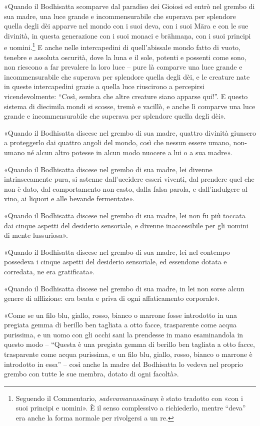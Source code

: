«Quando il Bodhisatta scomparve dal paradiso dei Gioiosi ed entrò nel
grembo di sua madre, una luce grande e incommensurabile che superava per
splendore quella degli dèi apparve nel mondo con i suoi deva, con i suoi
Māra e con le sue divinità, in questa generazione con i suoi monaci e
brāhmaṇa, con i suoi principi e uomini.\footnote{Seguendo il Commentario, \emph{sadevamanussānaṃ} è stato tradotto con «con i suoi principi e uomini». È il senso complessivo a richiederlo, mentre “deva” era anche la forma normale per rivolgersi a un re.} E anche nelle
intercapedini di quell’abissale mondo fatto di vuoto, tenebre e assoluta
oscurità, dove la luna e il sole, potenti e possenti come sono, non
riescono a far prevalere la loro luce – pure là comparve una luce grande
e incommensurabile che superava per splendore quella degli dèi, e le
creature nate in queste intercapedini grazie a quella luce riuscirono a
percepirsi vicendevolmente: “Così, sembra che altre creature siano
apparse qui!”. E questo sistema di diecimila mondi si scosse, tremò e
vacillò, e anche lì comparve una luce grande e incommensurabile che
superava per splendore quella degli dèi».


«Quando il Bodhisatta discese nel grembo di sua madre, quattro divinità
giunsero a proteggerlo dai quattro angoli del mondo, così che nessun
essere umano, non-umano né alcun altro potesse in alcun modo nuocere a
lui o a sua madre».


«Quando il Bodhisatta discese nel grembo di sua madre, lei divenne
intrinsecamente pura, si astenne dall’uccidere esseri viventi, dal
prendere quel che non è dato, dal comportamento non casto, dalla falsa
parola, e dall’indulgere al vino, ai liquori e alle bevande fermentate».


«Quando il Bodhisatta discese nel grembo di sua madre, lei non fu più
toccata dai cinque aspetti del desiderio sensoriale, e divenne
inaccessibile per gli uomini di mente lussuriosa».


«Quando il Bodhisatta discese nel grembo di sua madre, lei nel contempo
possedeva i cinque aspetti del desiderio sensoriale, ed essendone dotata
e corredata, ne era gratificata».


«Quando il Bodhisatta discese nel grembo di sua madre, in lei non sorse
alcun genere di afflizione: era beata e priva di ogni affaticamento
corporale».


«Come se un filo blu, giallo, rosso, bianco o marrone fosse introdotto
in una pregiata gemma di berillo ben tagliata a otto facce, trasparente
come acqua purissima, e un uomo con gli occhi sani la prendesse in mano
esaminandola in questo modo – “Questa è una pregiata gemma di berillo
ben tagliata a otto facce, trasparente come acqua purissima, e un filo
blu, giallo, rosso, bianco o marrone è introdotto in essa” – così anche
la madre del Bodhisatta lo vedeva nel proprio grembo con tutte le sue
membra, dotato di ogni facoltà».


